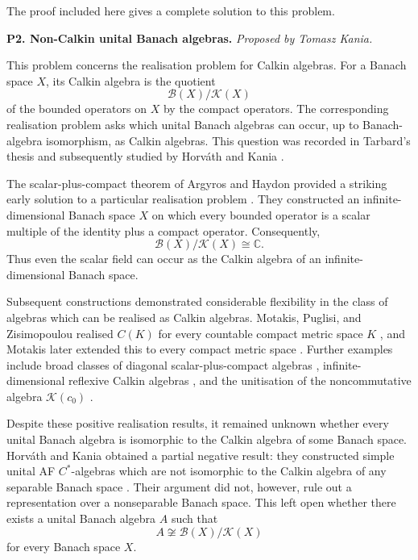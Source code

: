 \documentclass[11pt,reqno]{amsart}
\theoremstyle{plain}
\theoremstyle{definition}
\begin{document}
The proof included here gives a complete solution to this problem.

\medskip

\noindent\textbf{P2. Non-Calkin unital Banach algebras.}
\emph{Proposed by Tomasz Kania.}

This problem concerns the realisation problem for Calkin algebras. For a Banach space $X$, its Calkin algebra is the quotient
\begin{equation*}
    \mathcal B(X)/\mathcal K(X)
\end{equation*}
of the bounded operators on $X$ by the compact operators. The corresponding realisation problem asks which unital Banach algebras can occur, up to Banach-algebra isomorphism, as Calkin algebras. This question was recorded in Tarbard's thesis and subsequently studied by Horv\'ath and Kania
\cite{Tarbard2013,HorvathKania2021}.

The scalar-plus-compact theorem of Argyros and Haydon provided a striking early solution to a particular realisation problem \cite{ArgyrosHaydon2011}. They constructed an infinite-dimensional Banach space $X$ on which every bounded operator is a scalar multiple of the identity plus a compact operator. Consequently,
\begin{equation*}
    \mathcal B(X)/\mathcal K(X)\cong\mathbb C.
\end{equation*}
Thus even the scalar field can occur as the Calkin algebra of an infinite-dimensional Banach space.

Subsequent constructions demonstrated considerable flexibility in the class of algebras which can be realised as Calkin algebras. Motakis, Puglisi, and Zisimopoulou realised $C(K)$ for every countable compact metric space $K$ \cite{MotakisPuglisiZisimopoulou2016}, and Motakis later extended this to every compact metric space \cite{Motakis2024Calkin}. Further examples include broad classes of diagonal scalar-plus-compact algebras \cite{MotakisPuglisiTolias2020}, infinite-dimensional reflexive Calkin algebras \cite{MotakisPelczarBarwacz2025}, and the unitisation of the noncommutative algebra $\mathcal K(c_0)$ \cite{MotakisPuglisi2025}.

Despite these positive realisation results, it remained unknown whether every unital Banach algebra is isomorphic to the Calkin algebra of some Banach space. Horv\'ath and Kania obtained a partial negative result: they constructed simple unital AF $C^*$-algebras which are not isomorphic to the Calkin algebra of any separable Banach space \cite{HorvathKania2021}. Their argument did not, however, rule out a representation over a nonseparable Banach space. This left open whether there exists a unital Banach algebra $A$ such that
\begin{equation*}
    A\not\cong\mathcal B(X)/\mathcal K(X)
\end{equation*}
for every Banach space $X$.
\end{document}
